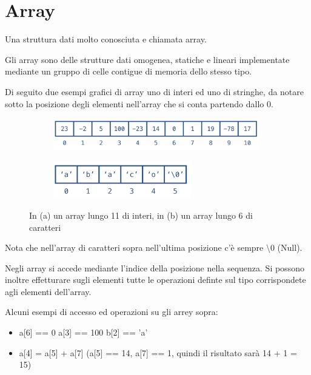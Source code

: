 \newpage
\section{Array}
Una struttura dati molto conosciuta e chiamata array.
\begin{definition}[Array]
Gli array sono delle strutture dati omogenea, statiche e lineari implementate mediante un gruppo di celle contigue di memoria dello stesso tipo.
\end{definition}

Di seguito due esempi grafici di array uno di interi ed uno di stringhe, da notare sotto la posizione degli elementi nell'array che si conta partendo dallo 0.
\begin{figure}[h!]
    \centering
    \begin{subfigure}{.5\textwidth}
        \centering
        \includegraphics[width=9cm]{images/esempio-array-1.png}
        \caption{}
    \end{subfigure}
    \hfill
    \begin{subfigure}{.4\textwidth}
        \centering
        \includegraphics[width=6cm]{images/esempio-array-2.png}
        \caption{}
    \end{subfigure}
    \caption{In (a) un array lungo 11 di interi, in (b) un array lungo 6 di caratteri}
\end{figure}
\begin{note}
Nota che nell'array di caratteri sopra nell'ultima posizione c'è sempre $\setminus0$ (Null).
\end{note}
Negli array si accede mediante l'indice della posizione nella sequenza. Si possono inoltre effetturare sugli elementi tutte le operazioni definte sul tipo corrispondete agli elementi dell'array.
\begin{example}
Alcuni esempi di accesso ed operazioni su gli arrey sopra:
\begin{itemize}
    \item a[6] == 0 \hspace{.5cm} a[3] == 100 \hspace{.5cm} b[2] == 'a' 
    \item a[4] = a[5] + a[7] \: \: (a[5] == 14, a[7] == 1, quindi il risultato sarà 14 + 1 = 15)  
\end{itemize}
\end{example}

